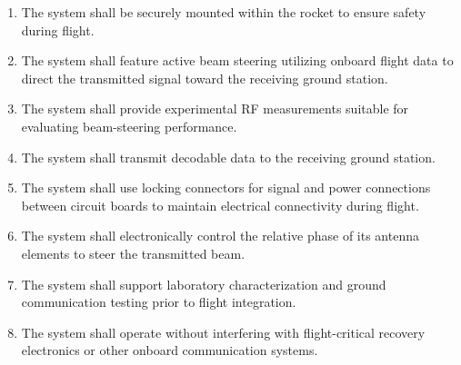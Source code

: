 \begin{enumerate}

    \item The system shall be securely mounted
    within the rocket to ensure safety
    during flight.

    \item The system shall feature active beam
    steering utilizing onboard flight data
    to direct the transmitted signal toward
    the receiving ground station.

    \item The system shall provide experimental
    RF measurements suitable for evaluating
    beam-steering performance.

    \item The system shall transmit decodable
    data to the receiving ground station.

    \item The system shall use locking
    connectors for signal and power
    connections between circuit boards
    to maintain electrical connectivity
    during flight.

    \item The system shall electronically
    control the relative phase of its
    antenna elements to steer the
    transmitted beam.




    \item The system shall support
    laboratory characterization
    and ground communication testing
    prior to flight integration.

    \item The system shall operate
    without interfering with
    flight-critical recovery
    electronics or other onboard
    communication systems.

\end{enumerate}